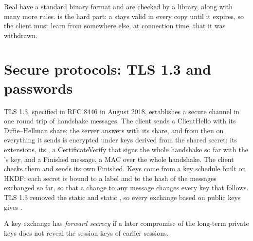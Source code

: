 \label{out:b3:public-key-cryptography:cert}

Real  have a standard binary format and are checked by a library, along with many more rules.  is the hard part: a  stays valid in every copy until it expires, so the client must learn from somewhere else, at connection time, that it was withdrawn.

\section{Secure protocols: TLS 1.3 and passwords}\label{sec:b3:public-key-cryptography:tls}

TLS 1.3, specified in RFC 8446 in August 2018, establishes a secure channel in one round trip of handshake messages. The client sends a ClientHello with its Diffie--Hellman share; the server answers with its share, and from then on everything it sends is encrypted under keys derived from the shared secret: its extensions, its , a CertificateVerify that signs the whole handshake so far with the 's key, and a Finished message, a MAC over the whole handshake. The client checks them and sends its own Finished. Keys come from a key schedule built on HKDF: each secret is bound to a label and to the hash of the messages exchanged so far, so that a change to any message changes every key that follows. TLS 1.3 removed the static  and static , so every exchange based on public keys gives . %

\begin{definition}\label{def:b3:public-key-cryptography:forward-secrecy}
A key exchange has \emph{forward secrecy} if a later compromise of the long-term private keys does not reveal the session keys of earlier sessions.
\end{definition}

